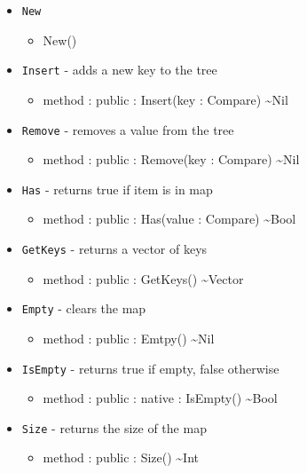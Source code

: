 \documentclass[11pt]{article}
\begin{document}
\begin{itemize}
\item \texttt{New}
  \begin{itemize}
  \item New()
  \end{itemize}
\item \texttt{Insert} - adds a new key to the tree
  \begin{itemize}
  \item method : public : Insert(key : Compare) \textasciitilde Nil
  \end{itemize}
\item \texttt{Remove} - removes a value from the tree
  \begin{itemize}
  \item method : public : Remove(key : Compare) \textasciitilde Nil
  \end{itemize}
\item \texttt{Has} - returns true if item is in map
  \begin{itemize}
  \item method : public : Has(value : Compare) \textasciitilde Bool
  \end{itemize}
\item \texttt{GetKeys} - returns a vector of keys
  \begin{itemize}
  \item method : public : GetKeys() \textasciitilde Vector
  \end{itemize}
\item \texttt{Empty} - clears the map
  \begin{itemize}
  \item method : public : Emtpy() \textasciitilde Nil
  \end{itemize}
\item \texttt{IsEmpty} - returns true if empty, false otherwise
  \begin{itemize}
  \item method : public : native : IsEmpty() \textasciitilde Bool
  \end{itemize}
\item \texttt{Size} - returns the size of the map
  \begin{itemize}
  \item method : public : Size() \textasciitilde Int
  \end{itemize}
\end{itemize}
\end{document}
